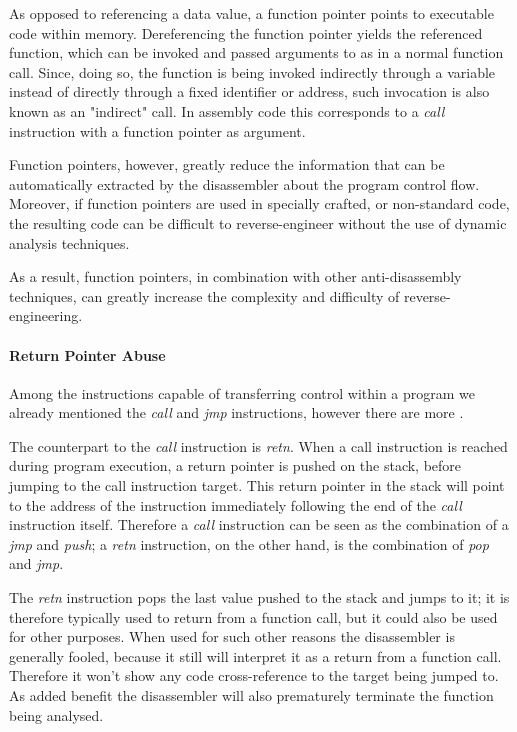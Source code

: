 \documentclass[pdfa%
,cucitura%
]{toptesi}
\begin{document}
As opposed to referencing a data value, a function pointer points to executable code within memory. Dereferencing the function pointer yields the referenced function, which can be invoked and passed arguments to as in a normal function call. Since, doing so, the function is being invoked indirectly through a variable instead of directly through a fixed identifier or address, such invocation is also known as an "indirect" call. In assembly code this corresponds to a \textit{call} instruction with a function pointer as argument.

Function pointers, however, greatly reduce the information that can be automatically extracted by the disassembler about the program control flow. Moreover, if function pointers are used in specially crafted, or non-standard code, the resulting code can be difficult to reverse-engineer without the use of dynamic analysis techniques.

As a result, function pointers, in combination with other anti-disassembly techniques, can greatly increase the complexity and difficulty of reverse-engineering.

\paragraph{Return Pointer Abuse}
Among the instructions capable of transferring control within a program we already mentioned the \textit{call} and \textit{jmp} instructions, however there are more \cite{SikorskiPMA}.

The counterpart to the \textit{call} instruction is \textit{retn}. When a call instruction is reached during program execution, a return pointer is pushed on the stack, before jumping to the call instruction target. This return pointer in the stack will point to the address of the instruction immediately following the end of the \textit{call} instruction itself.
Therefore a \textit{call} instruction can be seen as the combination of a \textit{jmp} and \textit{push}; a \textit{retn} instruction, on the other hand, is the combination of \textit{pop} and \textit{jmp}.

The \textit{retn} instruction pops the last value pushed to the stack and jumps to it; it is therefore typically used to return from a function call, but it could also be used for other purposes. When used for such other reasons the disassembler is generally fooled, because it still will interpret it as a return from a function call. Therefore it won't show any code cross-reference to the target being jumped to. As added benefit the disassembler will also prematurely terminate the function being analysed.
\end{document}
